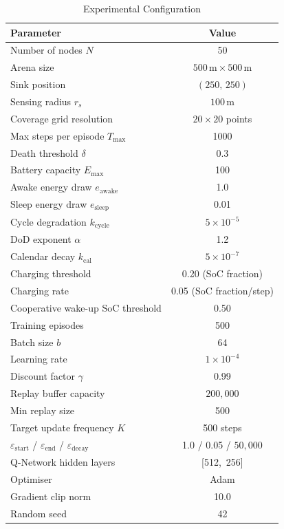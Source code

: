 \documentclass[journal]{IEEEtran}
\begin{document}
\begin{table}[!t]
\caption{Experimental Configuration\label{tab:config}}
\centering
\footnotesize
\setlength{\tabcolsep}{4pt}
\begin{tabular}{lc}
\toprule
\textbf{Parameter} & \textbf{Value} \\
\midrule
Number of nodes $N$                    & 50 \\
Arena size                             & $500\,\text{m} \times 500\,\text{m}$ \\
Sink position                          & $(250,\,250)$ \\
Sensing radius $r_s$                   & $100\,\text{m}$ \\
Coverage grid resolution               & $20 \times 20$ points \\
Max steps per episode $T_{\max}$       & 1000 \\
Death threshold $\delta$               & 0.3 \\
Battery capacity $E_{\max}$            & 100 \\
Awake energy draw $e_{\text{awake}}$   & 1.0 \\
Sleep energy draw $e_{\text{sleep}}$   & 0.01 \\
Cycle degradation $k_{\text{cycle}}$   & $5 \times 10^{-5}$ \\
DoD exponent $\alpha$                  & 1.2 \\
Calendar decay $k_{\text{cal}}$        & $5 \times 10^{-7}$ \\
Charging threshold                     & 0.20 (SoC fraction) \\
Charging rate                          & 0.05 (SoC fraction/step) \\
Cooperative wake-up SoC threshold      & 0.50 \\
Training episodes                      & 500 \\
Batch size $b$                         & 64 \\
Learning rate                          & $1 \times 10^{-4}$ \\
Discount factor $\gamma$               & 0.99 \\
Replay buffer capacity                 & $200{,}000$ \\
Min replay size                        & 500 \\
Target update frequency $K$            & 500 steps \\
$\varepsilon_{\text{start}}$ / $\varepsilon_{\text{end}}$ / $\varepsilon_{\text{decay}}$
                                       & 1.0 / 0.05 / $50{,}000$ \\
Q-Network hidden layers                & [512,~256] \\
Optimiser                              & Adam \\
Gradient clip norm                     & 10.0 \\
Random seed                            & 42 \\
\bottomrule
\end{tabular}
\end{table}
\end{document}
